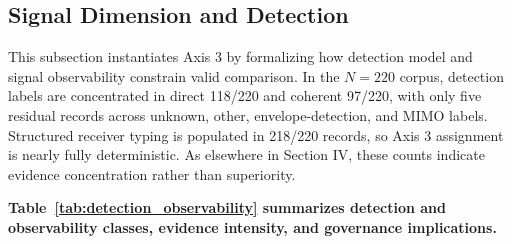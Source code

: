 \documentclass[letterpaper,journal]{IEEEtran}
\begin{document}
\subsection{Signal Dimension and Detection}
This subsection instantiates Axis 3 by formalizing how detection model and signal observability constrain valid comparison. In the $N=220$ corpus, detection labels are concentrated in direct 118/220 and coherent 97/220, with only five residual records across unknown, other, envelope-detection, and MIMO labels. Structured receiver typing is populated in 218/220 records, so Axis 3 assignment is nearly fully deterministic. As elsewhere in Section IV, these counts indicate evidence concentration rather than superiority.

\textbf{Table~\ref{tab:detection_observability} summarizes detection and observability classes, evidence intensity, and governance implications.}
\end{document}
